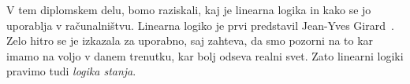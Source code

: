 V tem diplomskem delu, bomo raziskali, kaj je linearna logika in kako se jo uporablja v računalništvu.
Linearna logiko je prvi predstavil Jean-Yves Girard~\cite{girard1987linear}. Zelo hitro se je izkazala za uporabno, saj zahteva, 
da smo pozorni na to kar imamo na voljo v danem trenutku, kar bolj odseva realni svet. Zato linearni logiki pravimo tudi \emph{logika stanja}. %

